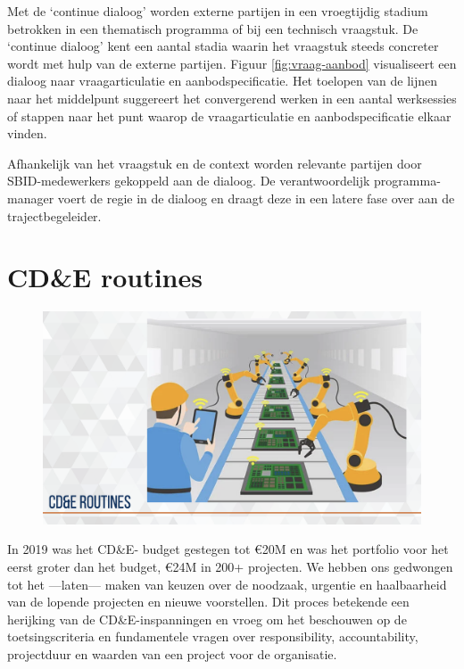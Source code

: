 \documentclass[
]{book}
\begin{document}
Met de `continue dialoog' worden externe partijen in een vroegtijdig stadium betrokken in een thematisch programma of bij een technisch vraagstuk. De `continue dialoog' kent een aantal stadia waarin het vraagstuk steeds concreter wordt met hulp van de externe partijen. Figuur \ref{fig:vraag-aanbod} visualiseert een dialoog naar vraagarticulatie en aanbodspecificatie. Het toelopen van de lijnen naar het middelpunt suggereert het convergerend werken in een aantal werksessies of stappen naar het punt waarop de vraagarticulatie en aanbodspecificatie elkaar vinden.

Afhankelijk van het vraagstuk en de context worden relevante partijen door SBID-medewerkers gekoppeld aan de dialoog. De verantwoordelijk programma-manager voert de regie in de dialoog en draagt deze in een latere fase over aan de trajectbegeleider.

\hypertarget{cde-routines}{%
\chapter{CD\&E routines}\label{cde-routines}}

\begin{figure}
\includegraphics[width=26.67in]{data/keynote-slides/20200430-CDE-Designprocess/20200430-CDE-Designprocess.034} \caption{ }\label{fig:unnamed-chunk-22}
\end{figure}

In 2019 was het CD\&E- budget gestegen tot €20M en was het portfolio voor het eerst groter dan het budget, €24M in 200+ projecten. We hebben ons gedwongen tot het ---laten--- maken van keuzen over de noodzaak, urgentie en haalbaarheid van de lopende projecten en nieuwe voorstellen. Dit proces betekende een herijking van de CD\&E-inspanningen en vroeg om het beschouwen op de toetsingscriteria en fundamentele vragen over responsibility, accountability, projectduur en waarden van een project voor de organisatie.
\end{document}
